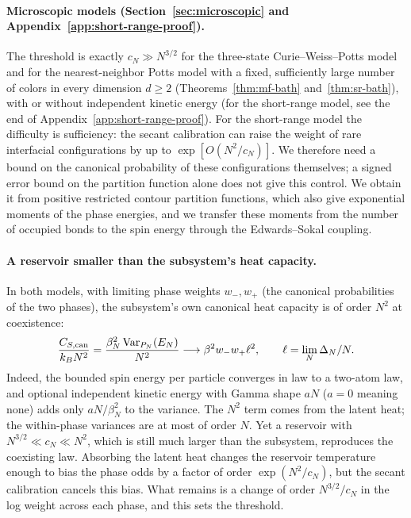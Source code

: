 \paragraph{Microscopic models (Section~\ref{sec:microscopic} and
Appendix~\ref{app:short-range-proof}).}
The threshold is exactly $c_N\gg N^{3/2}$ for the three-state
Curie--Weiss--Potts model and for the nearest-neighbor Potts model with
a fixed, sufficiently large number of colors in every dimension
$d\ge2$ (Theorems~\ref{thm:mf-bath} and~\ref{thm:sr-bath}), with or
without independent kinetic energy (for the short-range model, see the
end of Appendix~\ref{app:short-range-proof}). For the short-range
model the difficulty is sufficiency: the secant calibration can raise
the weight of rare interfacial configurations by up to
$\exp[O(N^2/c_N)]$. We therefore need a bound on the canonical
probability of these configurations themselves; a signed error bound
on the partition function alone does not give this control. We
obtain it from positive restricted contour partition functions, which
also give exponential moments of the phase energies, and we transfer
these moments from the number of occupied bonds to the spin energy
through the Edwards--Sokal coupling.

\paragraph{A reservoir smaller than the subsystem's heat capacity.}
In both models, with limiting phase weights $w_-,w_+$ (the canonical
probabilities of the two phases), the subsystem's own canonical heat
capacity is of order $N^2$ at coexistence:
\begin{equation}
 \frac{C_{S,\mathrm{can}}}{k_BN^2}
 =\frac{\beta_N^2\operatorname{Var}_{P_N}(E_N)}{N^2}
 \longrightarrow\beta^2w_-w_+\ell^2,
 \qquad \ell=\lim_N\Delta_N/N.
 \label{eq:canonical-coexistence-capacity}
\end{equation}
Indeed, the bounded spin energy per particle converges in law to a
two-atom law, and optional independent kinetic energy with Gamma shape
$aN$ ($a=0$ meaning none) adds only $aN/\beta_N^2$ to the variance. The
$N^2$ term comes from the latent heat; the within-phase variances are at
most of order $N$. Yet a reservoir with $N^{3/2}\ll c_N\ll N^2$, which
is still much larger than the subsystem, reproduces the coexisting law.
Absorbing the latent heat changes the reservoir temperature enough to
bias the phase odds by a factor of order $\exp(N^2/c_N)$, but the
secant calibration cancels this bias. What remains is a change of order
$N^{3/2}/c_N$ in the log weight across each phase, and this sets the
threshold.

